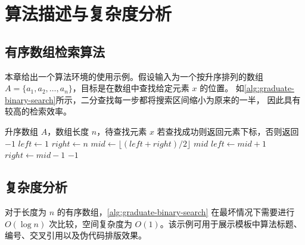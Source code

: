 
\chapter{算法描述与复杂度分析}

\section{有序数组检索算法}

本章给出一个算法环境的使用示例。假设输入为一个按升序排列的数组
$A = \{a_1, a_2, \ldots, a_n\}$，目标是在数组中查找给定元素 $x$ 的位置。
如\autoref{alg:graduate-binary-search}所示，二分查找每一步都将搜索区间缩小为原来的一半，
因此具有较高的检索效率。

\begin{algorithm}[htbp]
    \caption{二分查找算法示例}
    \label{alg:graduate-binary-search}
    \begin{algorithmic}[1]
        \Require 升序数组 $A$，数组长度 $n$，待查找元素 $x$
        \Ensure 若查找成功则返回元素下标，否则返回 $-1$
        \State $left \gets 1$
        \State $right \gets n$
            \State $mid \gets \lfloor (left + right) / 2 \rfloor$
                \State \Return $mid$
                \State $left \gets mid + 1$
            \Else
                \State $right \gets mid - 1$
            \EndIf
        \EndWhile
        \State \Return $-1$
    \end{algorithmic}
\end{algorithm}

\section{复杂度分析}

对于长度为 $n$ 的有序数组，\autoref{alg:graduate-binary-search} 在最坏情况下需要进行
$O(\log n)$ 次比较，空间复杂度为 $O(1)$。该示例可用于展示模板中算法标题、
编号、交叉引用以及伪代码排版效果。
